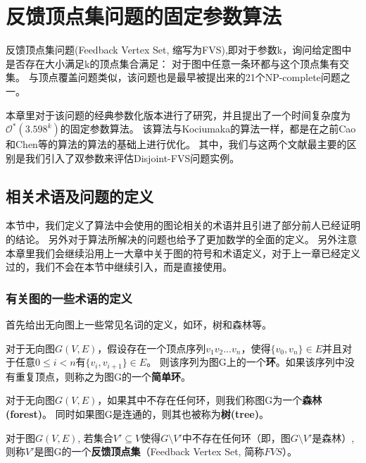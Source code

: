 \chapter{反馈顶点集问题的固定参数算法}
反馈顶点集问题(Feedback Vertex Set, 缩写为FVS),即对于参数k，询问给定图中是否存在大小满足k的顶点集合满足：
对于图中任意一条环都与这个顶点集有交集。
与顶点覆盖问题类似，该问题也是最早被提出来的21个NP-complete问题之一\cite{karp1972reducibility}。

本章里对于该问题的经典参数化版本进行了研究，并且提出了一个时间复杂度为$\mathcal{O}^*(3.598^k)$的固定参数算法。
该算法与Kociumaka的算法一样，都是在之前Cao和Chen等的算法的算法的基础上进行优化。
其中，我们与这两个文献最主要的区别是我们引入了双参数来评估Disjoint-FVS问题实例。

\section{相关术语及问题的定义}
本节中，我们定义了算法中会使用的图论相关的术语并且引进了部分前人已经证明的结论。
另外对于算法所解决的问题也给予了更加数学的全面的定义。
另外注意本章里我们会继续沿用上一大章中关于图的符号和术语定义，对于上一章已经定义过的，我们不会在本节中继续引入，而是直接使用。

\subsection{有关图的一些术语的定义}
首先给出无向图上一些常见名词的定义，如环，树和森林等。
\begin{definition}[环]
对于无向图$G(V,E)$，假设存在一个顶点序列$v_1v_2...v_n$，使得$\{v_0, v_n\} \in E$并且对于任意$0 \le i < n$有$\{v_i, v_{i+1}\} \in E$。
则该序列为图G上的一个\textbf{环}。如果该序列中没有重复顶点，则称之为图G的一个\textbf{简单环}。
\end{definition}

\begin{definition}
对于无向图$G(V,E)$，如果其中不存在任何环，则我们称图G为一个\textbf{森林(forest)}。
同时如果图G是连通的，则其也被称为\textbf{树(tree)}。
\end{definition}

\begin{definition}[反馈顶点集]
对于图$G(V, E)$, 若集合$V' \subseteq V$使得$G \setminus V'$中不存在任何环（即，图$G \setminus V'$是森林）,
则称$V'$是图G的一个\textbf{反馈顶点集}（Feedback Vertex Set, 简称$FVS$）。
\end{definition}

